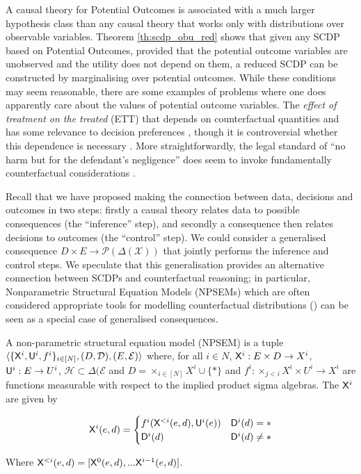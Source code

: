 \begin{example}\label{ex:nonst_distn}

\end{example}

A causal theory for Potential Outcomes is associated with a much larger hypothesis class than any causal theory that works only with distributions over observable variables. Theorem \ref{th:scdp_obu_red} shows that given any SCDP based on Potential Outcomes, provided that the potential outcome variables are unobserved and the utility does not depend on them, a reduced SCDP can be constructed by marginalising over potential outcomes. While these conditions may seem reasonable, there are some examples of problems where one does apparently care about the values of potential outcome variables. The \emph{effect of treatment on the treated} (ETT) that depends on counterfactual quantities and has some relevance to decision preferences \cite{rubin_estimating_1974}, though it is controversial whether this dependence is necessary \cite{geneletti2007defining}. More straightforwardly, the legal standard of ``no harm but for the defendant's negligence'' does seem to invoke fundamentally counterfactual considerations \cite{pearl_causality:_2009}.

Recall that we have proposed making the connection between data, decisions and outcomes in two steps: firstly a causal theory relates data to possible consequences (the ``inference'' step), and secondly a consequence then relates decisions to outcomes (the ``control'' step). We could consider a generalised consequence $D\times E\to \mathscr{P}(\Delta(\mathcal{X}))$ that jointly performs the inference and control steps. We speculate that this generalisation provides an alternative connection between SCDPs and counterfactual reasoning; in particular, Nonparametric Structural Equation Models (NPSEMs) which are often considered appropriate tools for modelling counterfactual distributions (\cite{pearl_causality:_2009,richardson2013single}) can be seen as a special case of generalised consequences.

\begin{definition}[NPSEM]\label{def:NPSEM}
A non-parametric structural equation model (NPSEM) is a tuple $\langle \{\mathsf{X}^i, \mathsf{U}^i, f^i\}_{i\in[N]}, (D,\mathcal{D}), (E,\mathcal{E})\rangle$ where, for all $i\in N$, $\mathsf{X}^i:E\times D \to X^i$, $\mathsf{U}^i:E\to U^i$, $\mathscr{H}\subset\Delta(\mathcal{E}$ and $D=\times_{i\in[N]} X^i\cup\{*\}$ and $f^i:\times_{j<i} X^i\times U^i\to X^i$ are functions measurable with respect to the implied product sigma algebras. The $\mathsf{X}^i$ are given by

\begin{align}
    \mathsf{X}^i(e,d) = \begin{cases} f^i(\mathsf{X}^{<i}(e,d),\mathsf{U}^i(e)) &\mathsf{D}^i(d)=*\\ 
    \mathsf{D}^i(d)  &\mathsf{D}^i(d)\neq * \end{cases}
\end{align}

Where $\mathsf{X}^{<i}(e,d)=[\mathsf{X}^0(e,d),...\mathsf{X}^{i-1}(e,d)]$.
\end{definition}

